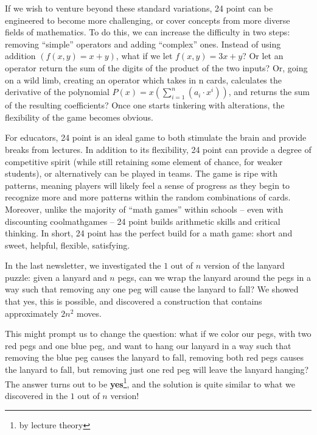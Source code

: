 \documentclass{article}
\begin{document}
\begin{multicols}{3}
If we wish to venture beyond these standard variations, 24 point can be engineered to become more challenging, or cover concepts from more diverse fields of mathematics. To do this, we can increase the difficulty in two steps: removing “simple” operators and adding “complex” ones. Instead of using addition $(f(x,y) = x+y)$, what if we let $f(x,y) = 3x+y$? Or let an operator return the sum of the digits of the product of the two inputs? Or, going on a wild limb, creating an operator which takes in n cards, calculates the derivative of the polynomial $P(x) = x(\sum_{i=1}^n (a_i \cdot x^i))$, and returns the sum of the resulting coefficients? Once one starts tinkering with alterations, the flexibility of the game becomes obvious.

For educators, 24 point is an ideal game to both stimulate the brain and provide breaks from lectures. In addition to its flexibility, 24 point can provide a degree of competitive spirit (while still retaining some element of chance, for weaker students), or alternatively can be played in teams. The game is ripe with patterns, meaning players will likely feel a sense of progress as they begin to recognize more and more patterns within the random combinations of cards. Moreover, unlike the majority of “math games” within schools – even with discounting coolmathgames – 24 point builds arithmetic skills and critical thinking. In short, 24 point has the perfect build for a math game: short and sweet, helpful, flexible, satisfying. 
\closearticle

In the last newsletter, we investigated the $1$ out of $n$ version of the lanyard puzzle: given a lanyard and $n$ pegs, can we wrap the lanyard around the pegs in a way such that removing any one peg will cause the lanyard to fall? We showed that yes, this is possible, and discovered a construction that contains approximately $2n^2$ moves. 

This might prompt us to change the question: what if we color our pegs, with two red pegs and one blue peg, and want to hang our lanyard in a way such that removing the blue peg causes the lanyard to fall, removing both red pegs causes the lanyard to fall, but removing just one red peg will leave the lanyard hanging? The answer turns out to be \textbf{yes}\footnote{by lecture theory}, and the solution is quite similar to what we discovered in the $1$ out of $n$ version! 


\end{multicols}
\end{document}
